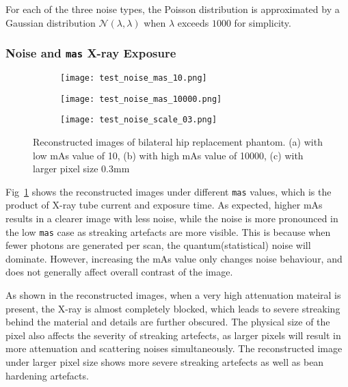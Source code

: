 \documentclass[10pt,twocolumn]{article}
\begin{document}
For each of the three noise types, the Poisson distribution is approximated by a Gaussian distribution $\mathcal{N}(\lambda, \lambda)$ when $\lambda$ exceeds $1000$ for simplicity.

\subsubsection{Noise and \texttt{mas} X-ray Exposure}
\begin{figure}[htbp]
    \centering
    \begin{subfigure}[b]{0.3\linewidth}
        \texttt{[image: test\_noise\_mas\_10.png]}
        \caption{}
    \end{subfigure}
    \begin{subfigure}[b]{0.3\linewidth}
        \texttt{[image: test\_noise\_mas\_10000.png]}
        \caption{}
    \end{subfigure}
    \begin{subfigure}[b]{0.3\linewidth}
        \texttt{[image: test\_noise\_scale\_03.png]}
        \caption{}
    \end{subfigure}
    \caption{Reconstructed images of bilateral hip replacement phantom. (a) with low mAs value of 10, (b) with high mAs value of 10000, (c) with larger pixel size 0.3mm}
    \label{fig:noise_mas}
\end{figure}
Fig~\ref{fig:noise_mas} shows the reconstructed images under different \texttt{mas} values, which is the product of X-ray tube current and exposure time.
As expected, higher mAs results in a clearer image with less noise, while the noise is more pronounced in the low \texttt{mas} case as streaking artefacts are more visible. This is because when fewer photons are generated per scan, the quantum(statistical) noise will dominate. 
However, increasing the mAs value only changes noise behaviour, and does not generally affect overall contrast of the image.

As shown in the reconstructed images, when a very high attenuation mateiral is present, the X-ray is almost completely blocked, which leads to severe streaking behind the material and details are further obscured.
The physical size of the pixel also affects the severity of streaking artefects, as larger pixels will result in more attenuation and scattering noises simultaneously. The reconstructed image under larger pixel size shows more severe streaking artefects as well as bean hardening artefacts.
\end{document}
